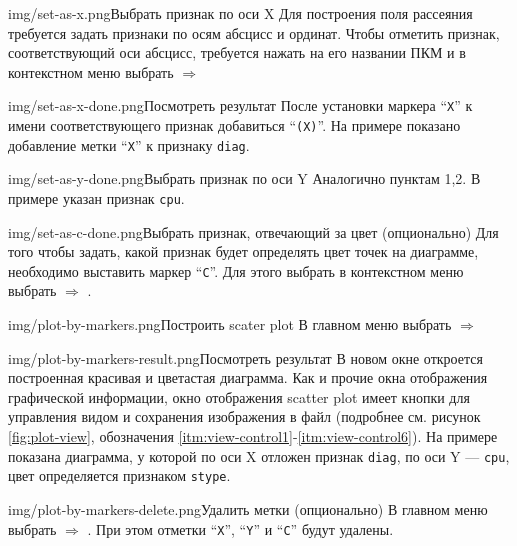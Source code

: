 \documentclass[12pt,tikz]{instruction}
\begin{document}
\begin{steps}
	\begin{ist}{img/set-as-x.png}{Выбрать признак по оси X}
		Для построения поля рассеяния требуется задать признаки по осям абсцисс и ординат. Чтобы отметить признак, соответствующий оси абсцисс, требуется нажать на его названии ПКМ и в контекстном меню выбрать
		 $\Rightarrow$ 
	\end{ist}
	\begin{ist}{img/set-as-x-done.png}{Посмотреть результат}
		После установки маркера ``\texttt{X}'' к имени соответствующего признак добавиться ``\texttt{(X)}''. На примере показано добавление метки ``\texttt{X}''  к признаку \texttt{diag}.
	\end{ist}	
	\begin{ist}{img/set-as-y-done.png}{Выбрать признак по оси Y}
		Аналогично пунктам 1,2. В примере указан признак \texttt{cpu}.
	\end{ist}
	\begin{ist}{img/set-as-c-done.png}{Выбрать признак, отвечающий за цвет (опционально)}
		Для того чтобы задать, какой признак будет определять цвет точек на диаграмме, необходимо выставить маркер ``\texttt{C}''. Для этого выбрать в контекстном меню выбрать  $\Rightarrow$ . 
	\end{ist}
	\begin{ist}{img/plot-by-markers.png}{Построить scater plot}
		В главном меню выбрать  $\Rightarrow$  
	\end{ist}
	\begin{ist}{img/plot-by-markers-result.png}{Посмотреть результат}
		В новом окне откроется построенная красивая и цветастая диаграмма. Как и прочие окна отображения графической информации, окно отображения scatter plot имеет кнопки для управления видом и сохранения изображения в файл (подробнее см. рисунок \ref{fig:plot-view}, обозначения \ref{itm:view-control1}-\ref{itm:view-control6}). На примере показана диаграмма, у которой по оси X отложен признак \texttt{diag}, по оси Y --- \texttt{cpu}, цвет определяется признаком \texttt{stype}.
	\end{ist}
	\begin{ist}{img/plot-by-markers-delete.png}{Удалить метки (опционально)}
		В главном меню выбрать  $\Rightarrow$ . При этом отметки ``\texttt{X}'', ``\texttt{Y}'' и ``\texttt{C}'' будут удалены.
	\end{ist}
	
\end{steps}
\end{document}
